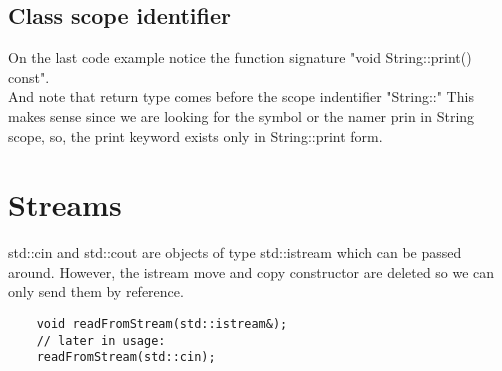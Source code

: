 \documentclass[11pt,twoside,a4paper]{report}
\begin{document}
\section{Class scope identifier}
On the last code example notice the function signature "void String::print() const".\\
And note that return type comes before the scope indentifier "String::" This makes sense since we are looking for the symbol or the namer prin in String scope,
so, the print keyword exists only in String::print form.

\chapter{Streams}
std::cin and std::cout are objects of type std::istream which can be passed around. However, the istream move and copy constructor are deleted so we can only send them by reference.

\begin{lstlisting}
    void readFromStream(std::istream&);
    // later in usage:
    readFromStream(std::cin);
\end{lstlisting}
\end{document}
